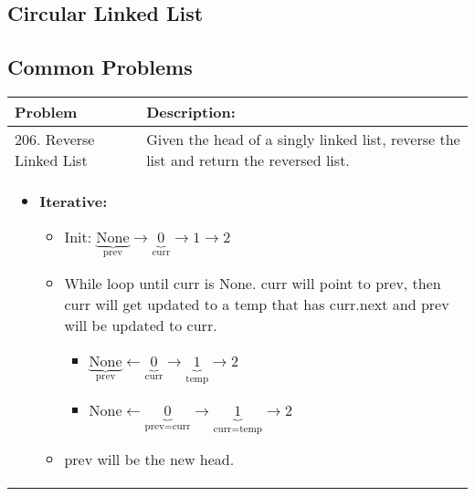\subsection{Circular Linked List}
\begin{algo}

\end{algo}
\newpage 

\subsection{Common Problems}
\begin{summary}
    \begin{center}
        \begin{tabular}{ll}
            \toprule
            \textbf{Problem} & \textbf{Description:} \\
            \midrule
                206. Reverse Linked List & Given the head of a singly linked list, reverse the list and return the reversed list. \\
                \multicolumn{2}{p{\linewidth}}{
                    \begin{itemize}
                        \item \textbf{Iterative:} 
                        \begin{itemize}
                            \item Init: $\underbrace{\text{None}}_{\text{prev}}\rightarrow\underbrace{0}_{\text{curr}}\rightarrow1\rightarrow2$
                            \item While loop until curr is None. curr will point to prev, then curr will get updated to a temp that has curr.next and prev will be updated to curr.
                            \begin{itemize}
                                \item $\underbrace{\text{None}}_{\text{prev}}\leftarrow\underbrace{0}_{\text{curr}}\rightarrow\underbrace{1}_{\text{temp}}\rightarrow2$
                                \item $\text{None}\leftarrow\underbrace{0}_{\text{prev=curr}}\rightarrow\underbrace{1}_{\text{curr=temp}}\rightarrow2$
                            \end{itemize}
                            \item prev will be the new head. 
                        \end{itemize}
                    \end{itemize}
                } \\
            \bottomrule
        \end{tabular}
    \end{center}
\end{summary}

